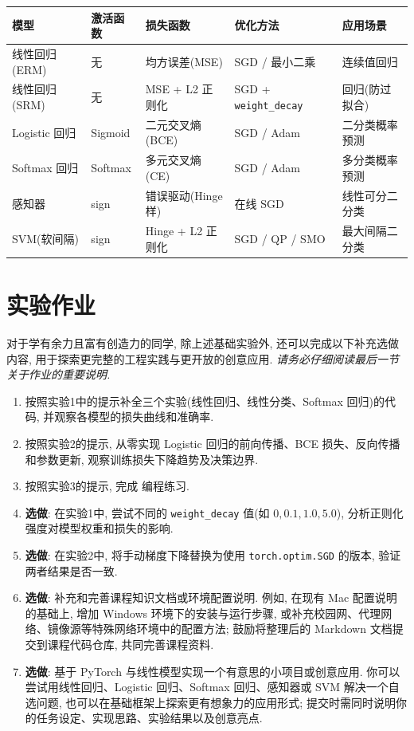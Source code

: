 \documentclass{../../nndlcourse}
\begin{document}
\begin{center}
\begin{tabular}{|l|l|l|l|l|}
\hline
\textbf{模型} & \textbf{激活函数} & \textbf{损失函数} & \textbf{优化方法} & \textbf{应用场景} \\
\hline
线性回归(ERM) & 无 & 均方误差(MSE) & SGD / 最小二乘 & 连续值回归 \\
线性回归(SRM) & 无 & MSE + L2 正则化 & SGD + \texttt{weight\_decay} & 回归(防过拟合)\\
Logistic 回归 & Sigmoid & 二元交叉熵(BCE) & SGD / Adam & 二分类概率预测 \\
Softmax 回归 & Softmax & 多元交叉熵(CE) & SGD / Adam & 多分类概率预测 \\
感知器 & sign & 错误驱动(Hinge 样) & 在线 SGD & 线性可分二分类 \\
SVM(软间隔) & sign & Hinge + L2 正则化 & SGD / QP / SMO & 最大间隔二分类 \\
\hline
\end{tabular}
\end{center}




\section{实验作业}

对于学有余力且富有创造力的同学, 除上述基础实验外, 还可以完成以下补充选做内容, 用于探索更完整的工程实践与更开放的创意应用. \emph{请务必仔细阅读最后一节关于作业的重要说明.}

\begin{enumerate}
    \item 按照实验1中的提示补全三个实验(线性回归、线性分类、Softmax 回归)的代码, 并观察各模型的损失曲线和准确率.
    \item 按照实验2的提示, 从零实现 Logistic 回归的前向传播、BCE 损失、反向传播和参数更新, 观察训练损失下降趋势及决策边界.
    \item 按照实验3的提示, 完成 编程练习.
    \item \textbf{选做}: 在实验1中, 尝试不同的 \texttt{weight\_decay} 值(如 $0, 0.1, 1.0, 5.0$), 分析正则化强度对模型权重和损失的影响.
    \item \textbf{选做}: 在实验2中, 将手动梯度下降替换为使用 \texttt{torch.optim.SGD} 的版本, 验证两者结果是否一致.
    \item \textbf{选做}: 补充和完善课程知识文档或环境配置说明. 例如, 在现有 Mac 配置说明的基础上, 增加 Windows 环境下的安装与运行步骤, 或补充校园网、代理网络、镜像源等特殊网络环境中的配置方法; 鼓励将整理后的 Markdown 文档提交到课程代码仓库, 共同完善课程资料.
    \item \textbf{选做}: 基于 PyTorch 与线性模型实现一个有意思的小项目或创意应用. 你可以尝试用线性回归、Logistic 回归、Softmax 回归、感知器或 SVM 解决一个自选问题, 也可以在基础框架上探索更有想象力的应用形式; 提交时需同时说明你的任务设定、实现思路、实验结果以及创意亮点.
\end{enumerate}
\end{document}
